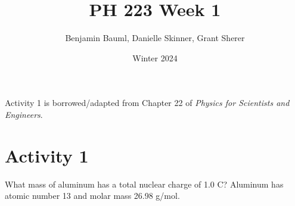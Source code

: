 \documentclass[]{article}
\title{PH 223 Week 1}
\author{Benjamin Bauml, Danielle Skinner, Grant Sherer}
\date{Winter 2024}
\newcommand{\excerpt}[1]{\colorbox{lightgray}{\parbox{14.8cm}{#1}} \\}
\begin{document}
\maketitle

\begin{center}
Activity 1 is borrowed/adapted from Chapter 22 of \textit{Physics for Scientists and Engineers}.
\end{center}
\section*{Activity 1}%
What mass of aluminum has a total nuclear charge of 1.0 C? Aluminum has atomic number 13 and molar mass 26.98 g/mol.
\iffalse
\excerpt{
What mass of aluminum has a total nuclear charge of 1.0 C? Aluminum has atomic number 13 and molar mass 26.98 g/mol.
}
\phantom{\parbox{\textwidth}{
Let $ N $ be the number of aluminum atoms, and let $ m $ be the mass we are looking for. It follows that the total charge $ Q = 13eN $ (where $ e = 1.60\times10^{-19} $ C is the charge on a single proton). We know that there are approximately $ 6.022\times10^{23} $ aluminum atoms in one mole of aluminum, and each mole has 0.02698 kg of mass. By using these ratios to convert units, we find
\[
\begin{split}
	m & = N \frac{1\text{ mol Al}}{6.022\times10^{23}\text{ Al atoms}} \frac{0.02698\text{ kg}}{1\text{ mo Al}} \\
	& = \frac{Q}{13e} \frac{0.02698\text{ kg}}{6.022\times10^{23}} \\
	& = \frac{1.0\text{ C}}{13(1.60\times10^{-19}\text{ C})} \frac{0.02698\text{ kg}}{6.022\times10^{23}} \\
	& \approx 2.15\times10^{-8}\text{ kg}.
\end{split}
\]
The mass of aluminum with the desired nuclear charge is 21.5 nkg, which is minuscule; this illustrates howw small atoms and protons are. Due to the equal number of electrons present, this chunk of aluminum would likely be close to neutral.
}}
\fi
\end{document}
